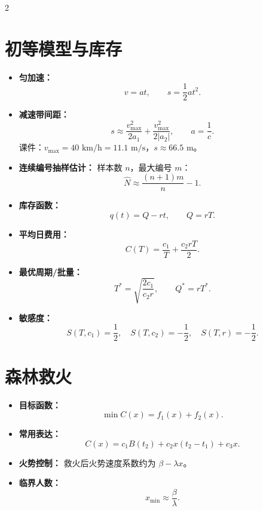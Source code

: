 \documentclass[UTF8,fontset=windows,10pt,a4paper]{ctexart}
\newcommand{\tagline}[1]{\textbf{\color{blue!60!black}#1：}}
\begin{document}
\begin{multicols}{2}
\section{初等模型与库存}
\begin{itemize}
  \item \tagline{匀加速}
  \[
    v=at,\qquad s=\frac12 at^2.
  \]
  \item \tagline{减速带间距}
  \[
    s\approx \frac{v_{\max}^2}{2a_1}
      +\frac{v_{\max}^2}{2|a_2|},\qquad a=\frac1c.
  \]
  课件：$v_{\max}=40\text{ km/h}=11.1\text{ m/s}$，$s\approx66.5\text{ m}$。
  \item \tagline{连续编号抽样估计}
  样本数 $n$，最大编号 $m$：
  \[
    \hat N\approx \frac{(n+1)m}{n}-1.
  \]
  \item \tagline{库存函数}
  \[
    q(t)=Q-rt,\qquad Q=rT.
  \]
  \item \tagline{平均日费用}
  \[
    C(T)=\frac{c_1}{T}+\frac{c_2rT}{2}.
  \]
  \item \tagline{最优周期/批量}
  \[
    T^*=\sqrt{\frac{2c_1}{c_2r}},\qquad Q^*=rT^*.
  \]
  \item \tagline{敏感度}
  \[
    S(T,c_1)=\frac12,\quad
    S(T,c_2)=-\frac12,\quad
    S(T,r)=-\frac12.
  \]
\end{itemize}

\section{森林救火}
\begin{itemize}
  \item \tagline{目标函数}
  \[
    \min C(x)=f_1(x)+f_2(x).
  \]
  \item \tagline{常用表达}
  \[
    C(x)=c_1B(t_2)+c_2x(t_2-t_1)+c_3x.
  \]
  \item \tagline{火势控制} 救火后火势速度系数约为 $\beta-\lambda x$。
  \item \tagline{临界人数}
  \[
    x_{\min}\approx \frac{\beta}{\lambda}.
  \]
\end{itemize}


\end{multicols}
\end{document}
